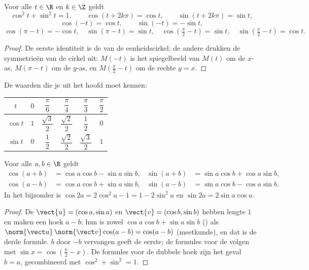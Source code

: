 \begin{proposition}\label{prop:g12:trigo:identities}
Voor alle $t \in \R$ en $k \in \Z$ geldt
\[
\cos^2 t + \sin^2 t = 1, \qquad
\cos(t + 2k\pi) = \cos t, \qquad
\sin(t + 2k\pi) = \sin t,
\]
\[
\cos(-t) = \cos t, \qquad \sin(-t) = -\sin t,
\]
\[
\cos(\pi - t) = -\cos t, \quad \sin(\pi - t) = \sin t, \quad
\cos\left(\tfrac{\pi}{2} - t\right) = \sin t, \quad
\sin\left(\tfrac{\pi}{2} - t\right) = \cos t .
\]
\end{proposition}

\begin{proof}
De eerste identiteit is de  van de eenheidscirkel; de andere
drukken de symmetrieën van de cirkel uit: $M(-t)$ is het spiegelbeeld van
$M(t)$ om de $x$-as, $M(\pi - t)$ om de $y$-as, en $M(\frac\pi2 - t)$ om de
rechte $y = x$.
\end{proof}

De waarden die je uit het hoofd moet kennen:
\begin{center}
\begin{tabular}{c|ccccc}
$t$ & $0$ & $\dfrac{\pi}{6}$ & $\dfrac{\pi}{4}$ & $\dfrac{\pi}{3}$ & $\dfrac{\pi}{2}$\\[6pt]
\hline\rule{0pt}{14pt}%
$\cos t$ & $1$ & $\dfrac{\sqrt3}{2}$ & $\dfrac{\sqrt2}{2}$ & $\dfrac12$ & $0$\\[6pt]
$\sin t$ & $0$ & $\dfrac12$ & $\dfrac{\sqrt2}{2}$ & $\dfrac{\sqrt3}{2}$ & $1$
\end{tabular}
\end{center}

\begin{proposition}[Somformules]\label{prop:g12:trigo:addition}
Voor alle $a, b \in \R$ geldt
\begin{align*}
\cos(a+b) &= \cos a \cos b - \sin a \sin b, &
\sin(a+b) &= \sin a \cos b + \cos a \sin b,\\
\cos(a-b) &= \cos a \cos b + \sin a \sin b, &
\sin(a-b) &= \sin a \cos b - \cos a \sin b.
\end{align*}
In het bijzonder is $\cos 2a = 2\cos^2 a - 1 = 1 - 2\sin^2 a$ en
$\sin 2a = 2 \sin a \cos a$.
\end{proposition}

\begin{proof}
De  $\vect{u} = (\cos a, \sin a)$ en $\vect{v} = (\cos b, \sin b)$
hebben lengte $1$ en maken een hoek $a - b$; hun  is zowel
$\cos a\cos b + \sin a \sin b$ () als
$\norm{\vect u}\,\norm{\vect v}\cos(a-b) = \cos(a - b)$ (meetkunde), en dat
is de derde formule. $b$ door $-b$ vervangen geeft de eerste; de formules
voor de  volgen met $\sin x = \cos(\frac\pi2 - x)$. De formules voor de
dubbele hoek zijn het geval $b = a$, gecombineerd met
$\cos^2 + \sin^2 = 1$.
\end{proof}

